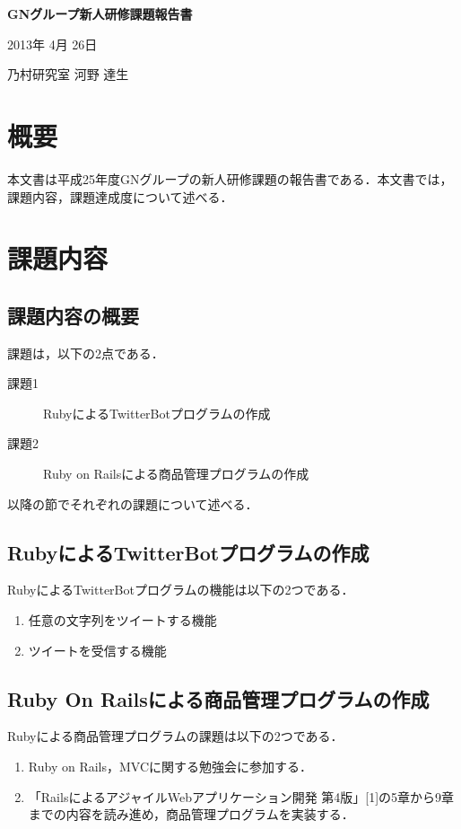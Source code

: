\documentclass[fleqn, 14pt]{extarticlej}
\begin{document}
\begin{center}
{\Large {\bf GNグループ新人研修課題報告書}}

\end{center}
\begin{flushright}
2013年 4月 26日

乃村研究室 河野 達生
\end{flushright}

\section{概要}
本文書は平成25年度GNグループの新人研修課題の報告書である．本文書では，課題内容，課題達成度について述べる．

\section{課題内容}
\subsection{課題内容の概要}
課題は，以下の2点である．
\begin{description}
  \item[課題1] RubyによるTwitterBotプログラムの作成
  \item[課題2] Ruby on Railsによる商品管理プログラムの作成
\end{description}
以降の節でそれぞれの課題について述べる．

\subsection{RubyによるTwitterBotプログラムの作成}
RubyによるTwitterBotプログラムの機能は以下の2つである．
\begin{enumerate}
\item 任意の文字列をツイートする機能
\item ツイートを受信する機能
\end{enumerate}


\subsection{Ruby On Railsによる商品管理プログラムの作成}
Rubyによる商品管理プログラムの課題は以下の2つである．
\begin{enumerate}
\item Ruby on Rails，MVCに関する勉強会に参加する．
\item「RailsによるアジャイルWebアプリケーション開発 第4版」[1]の5章から9章までの内容を読み進め，商品管理プログラムを実装する．
\end{enumerate}
\end{document}
